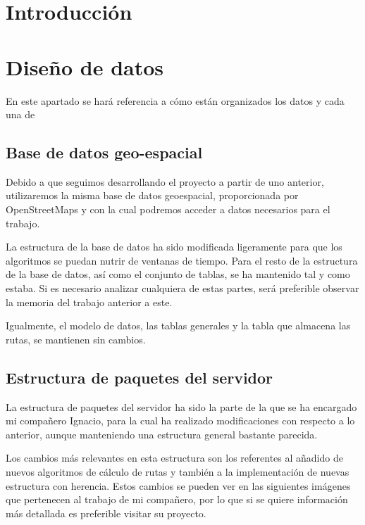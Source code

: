 
\section{Introducción}

\section{Diseño de datos}

En este apartado se hará referencia a cómo están organizados los datos y cada una de 

\subsection{Base de datos geo-espacial}

Debido a que seguimos desarrollando el proyecto a partir de uno anterior, utilizaremos la misma base de datos geoespacial, proporcionada por OpenStreetMaps y con la cual podremos acceder a datos necesarios para el trabajo.

La estructura de la base de datos ha sido modificada ligeramente para que los algoritmos se puedan nutrir de ventanas de tiempo. Para el resto de la estructura de la base de datos, así como el conjunto de tablas, se ha mantenido tal y como estaba. Si es necesario analizar cualquiera de estas partes, será preferible observar la memoria del trabajo anterior a este.

Igualmente, el modelo de datos, las tablas generales y la tabla que almacena las rutas, se mantienen sin cambios.

\subsection{Estructura de paquetes del servidor}

La estructura de paquetes del servidor ha sido la parte de la que se ha encargado mi compañero Ignacio, para la cual ha realizado modificaciones con respecto a lo anterior, aunque manteniendo una estructura general bastante parecida. 

Los cambios más relevantes en esta estructura son los referentes al añadido de nuevos algoritmos de cálculo de rutas y también a la implementación de nuevas estructura con herencia. Estos cambios se pueden ver en las siguientes imágenes que pertenecen al trabajo de mi compañero, por lo que si se quiere información más detallada es preferible visitar su proyecto.

